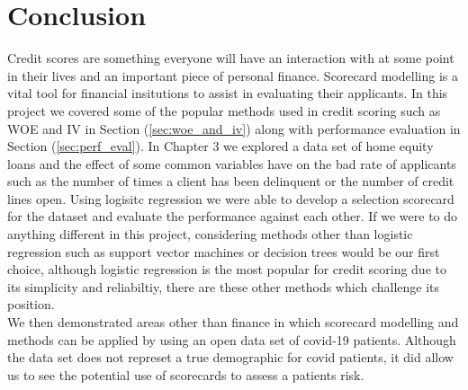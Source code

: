 \chapter{Conclusion} \label{cha:chapter-6}

Credit scores are something everyone will have an interaction with at some point in their lives and an important piece of personal finance. Scorecard modelling is a vital tool for financial insitutions to assist in evaluating their applicants. In this project we covered some of the popular methods used in credit scoring such as WOE and IV in Section (\ref{sec:woe_and_iv}) along with performance evaluation in Section (\ref{sec:perf_eval}). In Chapter 3 we explored a data set of home equity loans and the effect of some common variables have on the bad rate of applicants such as the number of times a client has been delinquent or the number of credit lines open. Using logisitc regression we were able to develop a selection scorecard for the dataset and evaluate the performance against each other. If we were to do anything different in this project, considering methods other than logistic regression such as support vector machines or decision trees would be our first choice, although logistic regression is the most popular for credit scoring due to its simplicity and reliabiltiy, there are these other methods which challenge its position. \\

We then demonstrated areas other than finance in which scorecard modelling and methods can be applied by using an open data set of covid-19 patients. Although the data set does not represet a true demographic for covid patients, it did allow us to see the potential use of scorecards to assess a patients risk. 